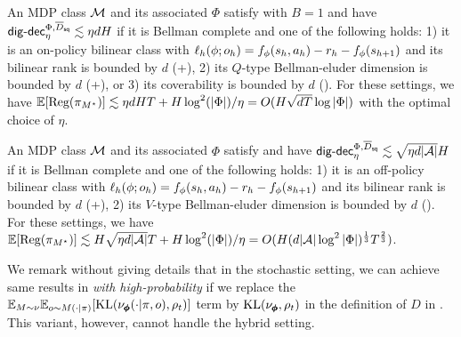 \begin{example}
    An MDP class $\mathcal{M}$ and its associated $\Phi$ satisfy   with $B=1$ and have $\mathsf{dig}\text{-}\mathsf{dec}_\eta^{\Phi,\overline{D}_{\mathsf{sq}}} \lesssim \eta dH$ if it is Bellman complete and one of the following holds: 1) it is an on-policy bilinear class with $\ell_h(\phi; o_h) = f_\phi(s_h,a_h) - r_h - f_{\phi}(s_{h+1})$ and its bilinear rank is bounded by $d$ (+), 2) its $Q$-type Bellman-eluder dimension is bounded by $d$ (+), or 3) its coverability is bounded by $d$ ().  For these settings, we have $\mathbb{E}[\text{\rm Reg}(\pi_{M^\star})] \lesssim \eta dH T + H\log^2(|\Phi|)/\eta = O(H\sqrt{dT}\log|\Phi|)$ with the optimal choice of $\eta$. 
\end{example}
\begin{example}
    An MDP class $\mathcal{M}$ and its associated $\Phi$ satisfy   and have $\mathsf{dig}\text{-}\mathsf{dec}_\eta^{\Phi,\overline{D}_{\mathsf{sq}}} \lesssim \sqrt{\eta d|\mathcal{A}|}H$ if it is Bellman complete and one of the following holds: 1) it is an off-policy bilinear class with $\ell_h(\phi; o_h) = f_\phi(s_h,a_h) - r_h - f_{\phi}(s_{h+1})$ and its bilinear rank is bounded by $d$ (+), 2) its $V$-type Bellman-eluder dimension is bounded by $d$ ().  For these settings, we have $\mathbb{E}[\text{\rm Reg}(\pi_{M^\star})]\lesssim H\sqrt{\eta d|\mathcal{A}|}T + H\log^2(|\Phi|)/\eta=O(H(d|\mathcal{A}|\log^2|\Phi|)^{\frac{1}{3}}T^{\frac{2}{3}})$. 
\end{example}
\fi
We remark without giving details that in the stochastic setting, we can achieve same results in  \emph{with high-probability} if we replace the $\mathbb{E}_{M\sim \nu} \mathbb{E}_{o\sim M(\cdot|\pi)}[\text{KL}(\nu_{\pmb{\phi}}(\cdot|\pi, o), \rho_t)]$ term by $\text{KL}(\nu_{\pmb{\phi}}, \rho_t)$ in the definition of $D$ in . This variant, however, cannot handle the hybrid setting.  



